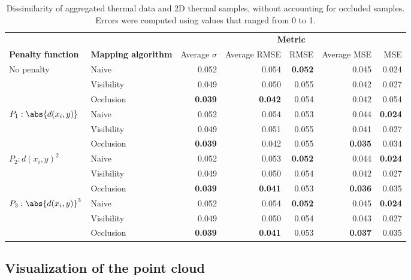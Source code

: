 \renewcommand{\arraystretch}{1.2}
\begin{table}[ht]
    \caption{Dissimilarity of aggregated thermal data and 2D thermal samples, without accounting for occluded samples. Errors were computed using values that ranged from 0 to 1. }
    \label{table:thermal_error_dispersion}
    \begin{tabular}{@{}llrrrrr@{}}
    \toprule
    & & \multicolumn{5}{c}{\textbf{Metric}} \\
    \cmidrule{3-7}
    \textbf{Penalty function} & \textbf{Mapping algorithm} & Average $\sigma$ & Average RMSE & RMSE & Average MSE & MSE\\
    \midrule
    \multirow{3}{*}{No penalty} & Naive & 0.052 & 0.054 & \textbf{0.052} & 0.045 & 0.024\\
    & Visibility & 0.049 & 0.050 & 0.055 & 0.042 & 0.027\\
    & Occlusion & \textbf{0.039} & \textbf{0.042} & 0.054 & 0.042 & 0.054\\
    \midrule
    \multirow{3}{*}{$P_1 : \abs{d(x_i, y)}$} & Naive & 0.052 & 0.054 & 0.053 & 0.044 & \textbf{0.024} \\
    & Visibility & 0.049 & 0.051 & 0.055 & 0.041 & 0.027 \\
    & Occlusion & \textbf{0.039} & 0.042 & 0.055 & \textbf{0.035} & 0.034 \\
    \midrule
    \multirow{3}{*}{$P_2 : d(x_i, y)^2$} & Naive & 0.052 & 0.053 & \textbf{0.052} & 0.044 & \textbf{0.024} \\
    & Visibility & 0.049 & 0.050 & 0.054 & 0.042 & 0.027 \\
    & Occlusion & \textbf{0.039} & \textbf{0.041} & 0.053 & \textbf{0.036} & 0.035\\
    \midrule
    \multirow{3}{*}{$P_3 : \abs{d(x_i, y)}^3$} & Naive & 0.052 & 0.054 & \textbf{0.052} & 0.045 & \textbf{0.024} \\
    & Visibility & 0.049 & 0.050 & 0.054 & 0.043 & 0.027 \\
    & Occlusion & \textbf{0.039} & \textbf{0.041} & 0.053 & \textbf{0.037} & 0.035 \\
    \bottomrule
    \end{tabular}
\end{table}
\renewcommand{\arraystretch}{1}

\subsection{Visualization of the point cloud}

